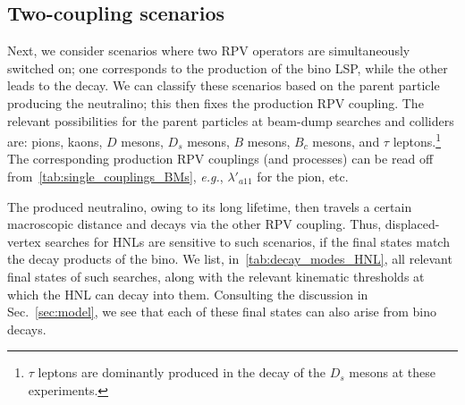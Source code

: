 \subsection{Two-coupling scenarios}


Next, we consider scenarios where two RPV operators are simultaneously switched on; one corresponds to the production of the bino LSP, while the other leads to the decay. We 
can classify these scenarios based on the parent particle producing the neutralino; this then fixes 
the production RPV coupling. The relevant possibilities for the parent particles at beam-dump searches
and colliders are: pions, kaons, $D$ mesons, $D_s$ mesons, $B$ mesons, $B_c$ 
mesons, and $\tau$ leptons.\footnote{$\tau$ leptons are dominantly produced in the decay of the 
$D_s$ mesons at these experiments.} The corresponding production RPV couplings (and processes) 
can be read off from~\cref{tab:single_couplings_BMs}, \textit{e.g.}, $\lambda'_{a11}$ for the 
pion, etc.


The produced neutralino, owing to its long lifetime, then travels a certain macroscopic distance and 
decays via the other RPV coupling. Thus, displaced-vertex searches for HNLs are sensitive to such scenarios, if the final states match the decay products of 
the bino. We list, in~\cref{tab:decay_modes_HNL}, all relevant final states of such 
searches, along with the relevant kinematic thresholds at which the HNL can decay 
into them. Consulting the discussion in Sec.~\ref{sec:model}, we see that each of these final states 
can also arise from bino decays.

